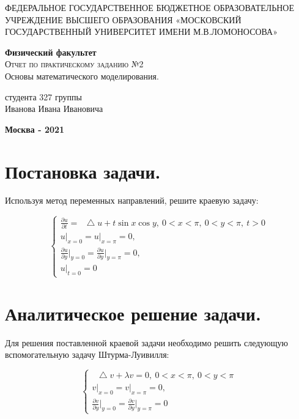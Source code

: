 \documentclass[a4paper,14pt]{article}
\newcommand*\Laplace{\mathop{}\!\mathbin\bigtriangleup}
\begin{document}
\begin{titlepage}
\begin{center}
    \large
    ФЕДЕРАЛЬНОЕ ГОСУДАРСТВЕННОЕ БЮДЖЕТНОЕ ОБРАЗОВАТЕЛЬНОЕ УЧРЕЖДЕНИЕ ВЫСШЕГО ОБРАЗОВАНИЯ «МОСКОВСКИЙ ГОСУДАРСТВЕННЫЙ УНИВЕРСИТЕТ ИМЕНИ М.В.ЛОМОНОСОВА»
     
    \textbf{Физический факультет}\\
    \vspace{4cm}
    \textsc{\Large Отчет по практическому заданию №2}\\[5mm]
    {\LARGE Основы математического моделирования.}
\end{center}
\vspace{7cm}
\null
\begin{flushright}
\normalsize студента 327 группы
\\Иванова Ивана Ивановича
\end{flushright}
\vfill
\begin{center}
\textbf{Москва - 2021}
\end{center}
\end{titlepage}


\section{Постановка задачи.}
Используя метод переменных направлений, решите краевую задачу:

\begin{equation*}
\begin{cases}
   \frac{\partial u}{\partial t} =\Laplace u + t \sin x \cos y, \ 0<x<\pi, \ 0<y<\pi, \ t>0\\
   u\bigg|_{x=0}=u\bigg|_{x=\pi}=0,\\
   \frac{\partial u}{\partial y}\bigg|_{y=0} = \frac{\partial u}{\partial y}\bigg|_{y=\pi}=0, \\
    u\bigg|_{t=0} = 0 
 \end{cases}
\end{equation*}


\section{Аналитическое решение задачи.}
Для решения поставленной краевой задачи необходимо решить следующую вспомогательную задачу Штурма-Луивилля:

\begin{equation*}
\begin{cases}
   \Laplace v + \lambda v = 0, \ 0<x<\pi, \ 0<y<\pi\\
   v\bigg|_{x=0}=v\bigg|_{x=\pi}=0,\\
   \frac{\partial v}{\partial y}\bigg|_{y=0} = \frac{\partial v}{\partial y}\bigg|_{y=\pi}=0
 \end{cases}
\end{equation*}
\end{document}
